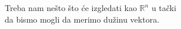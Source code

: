 \documentclass[preview]{standalone}
\begin{document}
\begin{center}
Treba nam nešto što će izgledati kao \(\mathbb{R}^n\) u tački\\
        da bismo mogli da merimo dužinu vektora.
\end{center}
\end{document}
